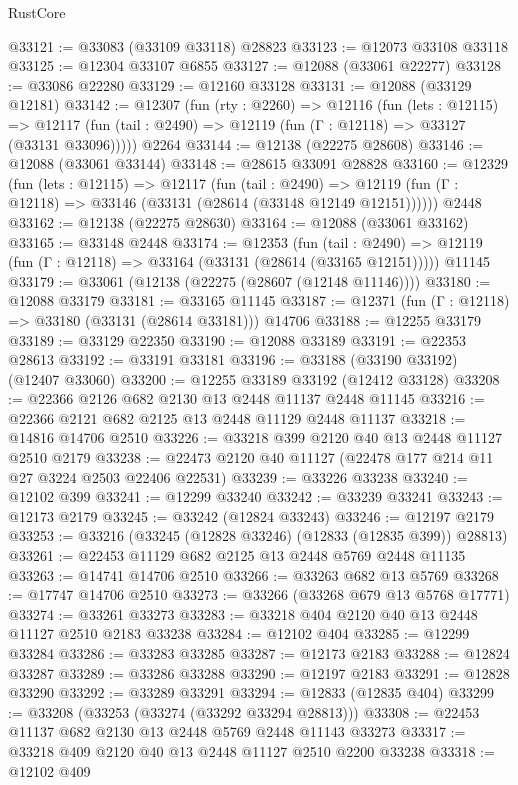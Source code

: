 \begin{lexlean}{RustCore}
\begin{coremodule}
@33121 := @33083 (@33109 @33118) @28823
@33123 := @12073 @33108 @33118
@33125 := @12304 @33107 @6855
@33127 := @12088 (@33061 @22277)
@33128 := @33086 @22280
@33129 := @12160 @33128
@33131 := @12088 (@33129 @12181)
@33142 := @12307
    (fun (rty : @2260) =>
    @12116
      (fun (lets : @12115) =>
      @12117 (fun (tail : @2490) => @12119 (fun (Γ : @12118) => @33127 (@33131 @33096)))))
    @2264
@33144 := @12138 (@22275 @28608)
@33146 := @12088 (@33061 @33144)
@33148 := @28615 @33091 @28828
@33160 := @12329
    (fun (lets : @12115) =>
    @12117
      (fun (tail : @2490) =>
      @12119 (fun (Γ : @12118) => @33146 (@33131 (@28614 (@33148 @12149 @12151))))))
    @2448
@33162 := @12138 (@22275 @28630)
@33164 := @12088 (@33061 @33162)
@33165 := @33148 @2448
@33174 := @12353
    (fun (tail : @2490) => @12119 (fun (Γ : @12118) => @33164 (@33131 (@28614 (@33165 @12151)))))
    @11145
@33179 := @33061 (@12138 (@22275 (@28607 (@12148 @11146))))
@33180 := @12088 @33179
@33181 := @33165 @11145
@33187 := @12371 (fun (Γ : @12118) => @33180 (@33131 (@28614 @33181))) @14706
@33188 := @12255 @33179
@33189 := @33129 @22350
@33190 := @12088 @33189
@33191 := @22353 @28613
@33192 := @33191 @33181
@33196 := @33188 (@33190 @33192) (@12407 @33060)
@33200 := @12255 @33189 @33192 (@12412 @33128)
@33208 := @22366 @2126 @682 @2130 @13 @2448 @11137 @2448 @11145
@33216 := @22366 @2121 @682 @2125 @13 @2448 @11129 @2448 @11137
@33218 := @14816 @14706 @2510
@33226 := @33218 @399 @2120 @40 @13 @2448 @11127 @2510 @2179
@33238 := @22473 @2120 @40 @11127 (@22478 @177 @214 @11 @27 @3224 @2503 @22406 @22531)
@33239 := @33226 @33238
@33240 := @12102 @399
@33241 := @12299 @33240
@33242 := @33239 @33241
@33243 := @12173 @2179
@33245 := @33242 (@12824 @33243)
@33246 := @12197 @2179
@33253 := @33216 (@33245 (@12828 @33246) (@12833 (@12835 @399)) @28813)
@33261 := @22453 @11129 @682 @2125 @13 @2448 @5769 @2448 @11135
@33263 := @14741 @14706 @2510
@33266 := @33263 @682 @13 @5769
@33268 := @17747 @14706 @2510
@33273 := @33266 (@33268 @679 @13 @5768 @17771)
@33274 := @33261 @33273
@33283 := @33218 @404 @2120 @40 @13 @2448 @11127 @2510 @2183 @33238
@33284 := @12102 @404
@33285 := @12299 @33284
@33286 := @33283 @33285
@33287 := @12173 @2183
@33288 := @12824 @33287
@33289 := @33286 @33288
@33290 := @12197 @2183
@33291 := @12828 @33290
@33292 := @33289 @33291
@33294 := @12833 (@12835 @404)
@33299 := @33208 (@33253 (@33274 (@33292 @33294 @28813)))
@33308 := @22453 @11137 @682 @2130 @13 @2448 @5769 @2448 @11143 @33273
@33317 := @33218 @409 @2120 @40 @13 @2448 @11127 @2510 @2200 @33238
@33318 := @12102 @409

\end{coremodule}
\end{lexlean}

